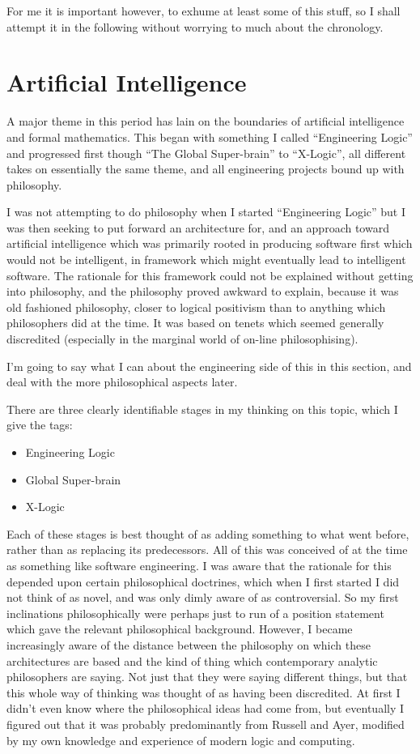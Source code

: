 \documentclass[10pt,titlepage]{book}
\begin{document}
For me it is important however, to exhume at least some of this stuff, so I shall attempt it in the following without worrying to much about the chronology.

\section{Artificial Intelligence}

A major theme in this period has lain on the boundaries of artificial intelligence and formal mathematics.
This began with something I called ``Engineering Logic'' and progressed first though ``The Global Super-brain'' to ``X-Logic'', all different takes on essentially the same theme, and all engineering projects bound up with philosophy.

I was not attempting to do philosophy when I started ``Engineering Logic'' but I was then seeking to put forward an architecture for, and an approach toward artificial intelligence which was primarily rooted in producing software first which would not be intelligent, in framework which might eventually lead to intelligent software.
The rationale for this framework could not be explained without getting into philosophy, and the philosophy proved awkward to explain, because it was old fashioned philosophy, closer to logical positivism than to anything which philosophers did at the time.
It was based on tenets which seemed generally discredited (especially in the marginal world of on-line philosophising).

I'm going to say what I can about the engineering side of this in this section, and deal with the more philosophical aspects later.

There are three clearly identifiable stages in my thinking on this topic, which I give the tags:

\begin{itemize}
\item Engineering Logic
\item Global Super-brain
\item X-Logic
\end{itemize}

Each of these stages is best thought of as adding something to what went before, rather than as replacing its predecessors.
All of this was conceived of at the time as something like software engineering.
I was aware that the rationale for this depended upon certain philosophical doctrines, which when I first started I did not think of as novel, and was only dimly aware of as controversial.
So my first inclinations philosophically were perhaps just to run of a position statement which gave the relevant philosophical background.
However, I became increasingly aware of the distance between the philosophy on which these architectures are based and the kind of thing which contemporary analytic philosophers are saying.
Not just that they were saying different things, but that this whole way of thinking was thought of as having been discredited.
At first I didn't even know where the philosophical ideas had come from, but eventually I figured out that it was probably predominantly from Russell and Ayer, modified by my own knowledge and experience of modern logic and computing.
\end{document}
